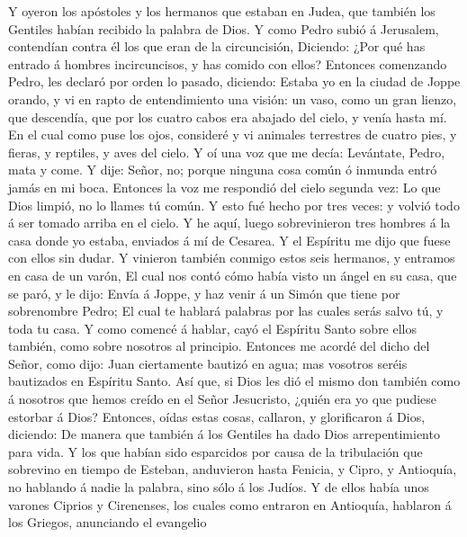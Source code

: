  Y oyeron los apóstoles y los hermanos que estaban en
Judea, que también los Gentiles habían recibido la palabra de Dios.
 Y como Pedro subió á Jerusalem, contendían contra él los
que eran de la circuncisión,  Diciendo: ¿Por qué has
entrado á hombres incircuncisos, y has comido con ellos? 
Entonces comenzando Pedro, les declaró por orden lo pasado, diciendo:
 Estaba yo en la ciudad de Joppe orando, y vi en rapto de
entendimiento una visión: un vaso, como un gran lienzo, que descendía,
que por los cuatro cabos era abajado del cielo, y venía hasta mí.
 En el cual como puse los ojos, consideré y vi animales
terrestres de cuatro pies, y fieras, y reptiles, y aves del cielo.
 Y oí una voz que me decía: Levántate, Pedro, mata y come.
 Y dije: Señor, no; porque ninguna cosa común ó inmunda
entró jamás en mi boca.  Entonces la voz me respondió del
cielo segunda vez: Lo que Dios limpió, no lo llames tú común.
 Y esto fué hecho por tres veces: y volvió todo á ser
tomado arriba en el cielo.  Y he aquí, luego
sobrevinieron tres hombres á la casa donde yo estaba, enviados á mí de
Cesarea.  Y el Espíritu me dijo que fuese con ellos sin
dudar. Y vinieron también conmigo estos seis hermanos, y entramos en
casa de un varón,  El cual nos contó cómo había visto un
ángel en su casa, que se paró, y le dijo: Envía á Joppe, y haz venir á
un Simón que tiene por sobrenombre Pedro;  El cual te
hablará palabras por las cuales serás salvo tú, y toda tu casa.
 Y como comencé á hablar, cayó el Espíritu Santo sobre
ellos también, como sobre nosotros al principio. 
Entonces me acordé del dicho del Señor, como dijo: Juan ciertamente
bautizó en agua; mas vosotros seréis bautizados en Espíritu Santo.
 Así que, si Dios les dió el mismo don también como á
nosotros que hemos creído en el Señor Jesucristo, ¿quién era yo que
pudiese estorbar á Dios?  Entonces, oídas estas cosas,
callaron, y glorificaron á Dios, diciendo: De manera que también á los
Gentiles ha dado Dios arrepentimiento para vida.  Y los
que habían sido esparcidos por causa de la tribulación que sobrevino en
tiempo de Esteban, anduvieron hasta Fenicia, y Cipro, y Antioquía, no
hablando á nadie la palabra, sino sólo á los Judíos.  Y
de ellos había unos varones Ciprios y Cirenenses, los cuales como
entraron en Antioquía, hablaron á los Griegos, anunciando el evangelio
